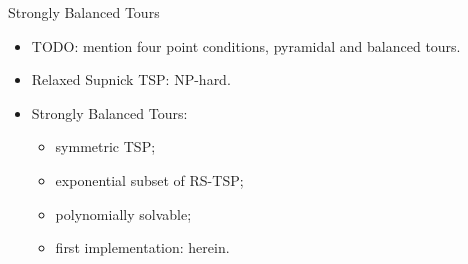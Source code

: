 \documentclass[
  size=10pt,
  style=klope,
  paper=screen,
  pauseslide,
  nopagebreaks,
  fleqn
]{powerdot}
\def\todo{\color{red}}
\begin{document}
\begin{slide}{Strongly Balanced Tours}
  \begin{itemize}
  \item
  {\todo TODO:} mention four point conditions, pyramidal and balanced tours.
  \item
  Relaxed Supnick TSP: NP-hard.
  \item
  Strongly Balanced Tours:
    \begin{itemize}
    \item symmetric TSP;
    \item exponential subset of RS-TSP;
    \item polynomially solvable;
    \item first implementation: herein.
    \end{itemize}
  \end{itemize}
\end{slide}
\end{document}
